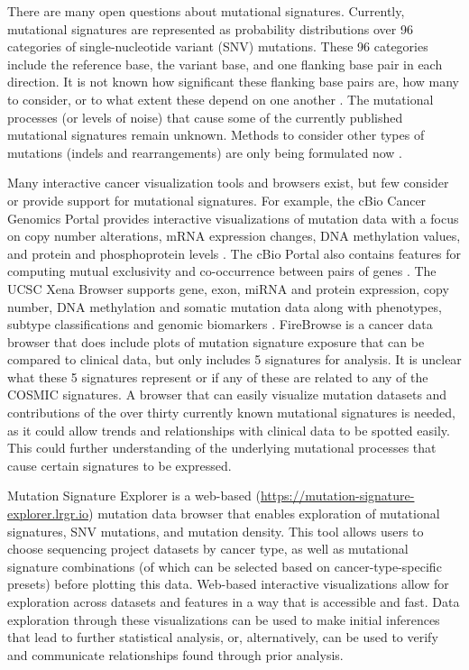 \documentclass[12pt, letterpaper]{article}
\begin{document}
There are many open questions about mutational signatures. 
Currently, mutational signatures are represented as probability distributions over 96 categories of single-nucleotide variant (SNV) mutations.
These 96 categories include the reference base, the variant base, and one flanking base pair in each direction. 
It is not known how significant these flanking base pairs are, how many to consider, or to what extent these depend on one another \cite{shiraishi2015simple}.
The mutational processes (or levels of noise) that cause some of the currently published mutational signatures remain unknown.
Methods to consider other types of mutations (indels and rearrangements) are only being formulated now \cite{zou2018validating}.


Many interactive cancer visualization tools and browsers exist, but few consider or provide support for mutational signatures. 
For example, the cBio Cancer Genomics Portal provides interactive visualizations of mutation data with a focus on copy number alterations, mRNA expression changes, DNA methylation values, and protein and phosphoprotein levels \cite{cerami2012cbio,gao2013integrative}.
The cBio Portal also contains features for computing mutual exclusivity and co-occurrence between pairs of genes \cite{cerami2012cbio,gao2013integrative}.
The UCSC Xena Browser supports gene, exon, miRNA and protein expression, copy number, DNA methylation and somatic mutation data along with phenotypes, subtype classifications and genomic biomarkers \cite{goldman2014ucsc,goldman2016ucsc}.
FireBrowse is a cancer data browser that does include plots of mutation signature exposure that can be compared to clinical data, but only includes 5 signatures for analysis.
It is unclear what these 5 signatures represent or if any of these are related to any of the COSMIC signatures.
A browser that can easily visualize mutation datasets and contributions of the over thirty currently known mutational signatures is needed, as it could allow trends and relationships with clinical data to be spotted easily.
This could further understanding of the underlying mutational processes that cause certain signatures to be expressed.

Mutation Signature Explorer is a web-based (\url{https://mutation-signature-explorer.lrgr.io}) mutation data browser that enables exploration of mutational signatures, SNV mutations, and mutation density.
This tool allows users to choose sequencing project datasets by cancer type, as well as mutational signature combinations (of which can be selected based on cancer-type-specific presets) before plotting this data. 
Web-based interactive visualizations allow for exploration across datasets and features in a way that is accessible and fast.
Data exploration through these visualizations can be used to make initial inferences that lead to further statistical analysis, or, alternatively, can be used to verify and communicate relationships found through prior analysis.
\end{document}
